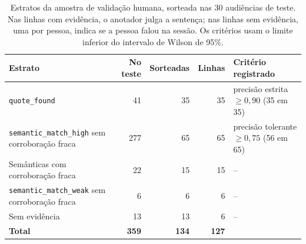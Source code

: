 \begin{table}[!htb]
  \centering
  \caption{Estratos da amostra de validação humana, sorteada nas 30 audiências de teste. Nas linhas
  com evidência, o anotador julga a sentença; nas linhas sem evidência, uma por pessoa, indica se a
  pessoa falou na sessão. Os critérios usam o limite inferior do intervalo de Wilson de 95\%.}
  \label{tab:amostra}
  \small
  \begin{tabularx}{\textwidth}{@{}Xrrrl@{}}
    \toprule
    \textbf{Estrato} & \textbf{No teste} & \textbf{Sorteadas} & \textbf{Linhas} & \textbf{Critério registrado} \\
    \midrule
    \texttt{quote\_found}                                   &  41 &  35 &  35 & precisão estrita $\geq 0{,}90$ (35 em 35) \\
    \texttt{semantic\_match\_high} sem corroboração fraca   & 277 &  65 &  65 & precisão tolerante $\geq 0{,}75$ (56 em 65) \\
    Semânticas com corroboração fraca                       &  22 &  15 &  15 & -- \\
    \texttt{semantic\_match\_weak} sem corroboração fraca   &   6 &   6 &   6 & -- \\
    Sem evidência                                           &  13 &  13 &   6 & -- \\
    \midrule
    \textbf{Total}                                          & \textbf{359} & \textbf{134} & \textbf{127} & \\
    \bottomrule
  \end{tabularx}
\end{table}
